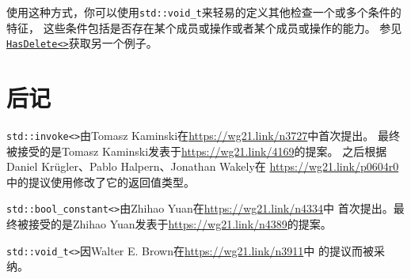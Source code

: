 使用这种方式，你可以使用\texttt{std::void\_t}来轻易的定义其他检查一个或多个条件的特征，
这些条件包括是否存在某个成员或操作或者某个成员或操作的能力。
参见\hyperref[ch30.1.2.2]{\texttt{HasDelete<>}}获取另一个例子。


\section{后记}
\texttt{std::invoke<>}由Tomasz Kaminski在\url{https://wg21.link/n3727}中首次提出。
最终被接受的是Tomasz Kaminski发表于\url{https://wg21.link/4169}的提案。
之后根据Daniel Krügler、Pablo Halpern、Jonathan Wakely在
\url{https://wg21.link/p0604r0}中的提议使用修改了它的返回值类型。

\texttt{std::bool\_constant<>}由Zhihao Yuan在\url{https://wg21.link/n4334}中
首次提出。最终被接受的是Zhihao Yuan发表于\url{https://wg21.link/n4389}的提案。

\texttt{std::void\_t<>}因Walter E. Brown在\url{https://wg21.link/n3911}中
的提议而被采纳。